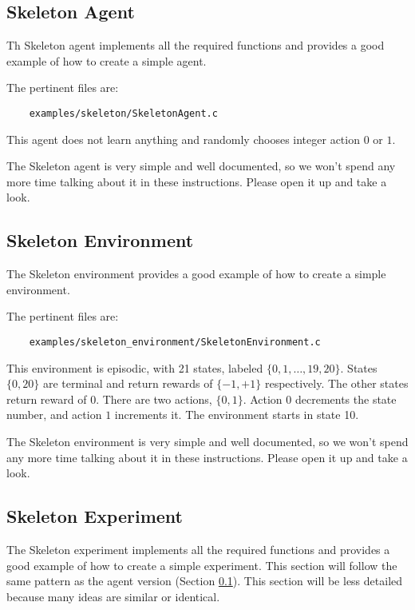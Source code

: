 \documentclass[11pt]{article}
\begin{document}
\subsection{Skeleton Agent}
\label{sec:agent}
Th Skeleton agent implements all the required functions and provides a good example of how to create a simple agent.

The pertinent files are:
\begin{verbatim}
	examples/skeleton/SkeletonAgent.c
\end{verbatim}

This agent does not learn anything and randomly chooses integer action $0$ or $1$.

The Skeleton agent is very simple and well documented, so we won't spend any more time talking about it in these instructions.
Please open it up and take a look.



\subsection{Skeleton Environment}
\label{sec:env}
The Skeleton environment provides a good example of how to create a simple environment. 

The pertinent files are:
\begin{verbatim}
	examples/skeleton_environment/SkeletonEnvironment.c
\end{verbatim}

This environment is episodic, with 21 states, labeled $\{0, 1,\ldots,19,20\}$. States $\{0, 20\}$ are terminal and return rewards of $\{-1, +1\}$ respectively.  The other states return reward of $0$.
There are two actions, $\{0, 1\}$.  Action $0$ decrements the state number, and action $1$ increments it. The environment starts in state 10.

The Skeleton environment is very simple and well documented, so we won't spend any more time talking about it in these instructions.
Please open it up and take a look.


\subsection{Skeleton Experiment}
The Skeleton experiment implements all the required functions and provides a good example of how to create a simple experiment.  This section will follow the same 
pattern as the agent version (Section \ref{sec:agent}).  This section will be less detailed because many ideas are similar or identical.
\end{document}
